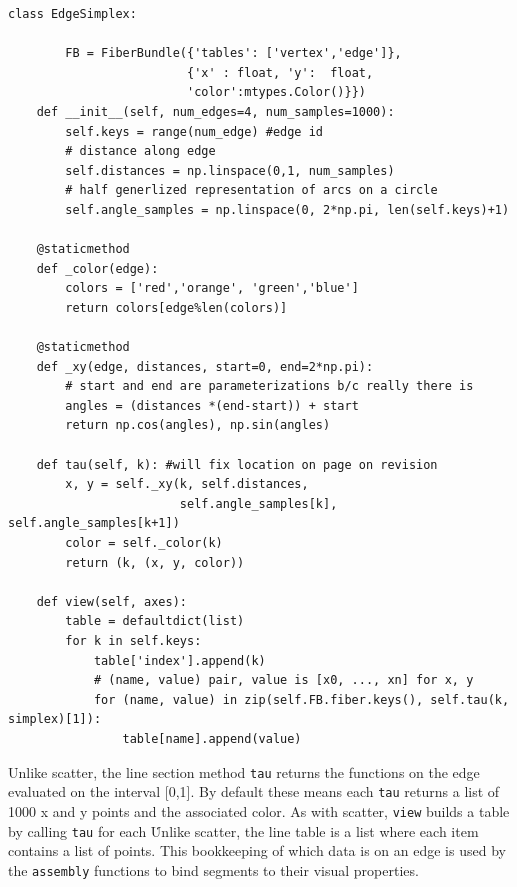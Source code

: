 \documentclass[../main.tex]{subfiles}
\begin{document}
\begin{verbatim}
class EdgeSimplex: 
    
        FB = FiberBundle({'tables': ['vertex','edge']},
                         {'x' : float, 'y':  float, 
                         'color':mtypes.Color()}})
    def __init__(self, num_edges=4, num_samples=1000): 
        self.keys = range(num_edge) #edge id
        # distance along edge
        self.distances = np.linspace(0,1, num_samples)
        # half generlized representation of arcs on a circle
        self.angle_samples = np.linspace(0, 2*np.pi, len(self.keys)+1)

    @staticmethod
    def _color(edge):
        colors = ['red','orange', 'green','blue']
        return colors[edge%len(colors)]

    @staticmethod
    def _xy(edge, distances, start=0, end=2*np.pi):
        # start and end are parameterizations b/c really there is 
        angles = (distances *(end-start)) + start
        return np.cos(angles), np.sin(angles)

    def tau(self, k): #will fix location on page on revision
        x, y = self._xy(k, self.distances, 
                        self.angle_samples[k], self.angle_samples[k+1]) 
        color = self._color(k) 
        return (k, (x, y, color))

    def view(self, axes):
        table = defaultdict(list)
        for k in self.keys:
            table['index'].append(k)
            # (name, value) pair, value is [x0, ..., xn] for x, y
            for (name, value) in zip(self.FB.fiber.keys(), self.tau(k, simplex)[1]):
                table[name].append(value)
\end{verbatim}
Unlike scatter, the line section method \texttt{tau} returns the functions on the edge evaluated on the interval [0,1]. By default these means each \texttt{tau} returns a list of 1000 x and y points and the associated color. As with scatter, \texttt{view} builds a table by calling \texttt{tau} for each \dbasepoint\. Unlike scatter, the line table is a list where each item contains a list of points. This bookkeeping of which data is on an edge is used by the \texttt{assembly} functions to bind segments to their visual properties. 
\end{document}
